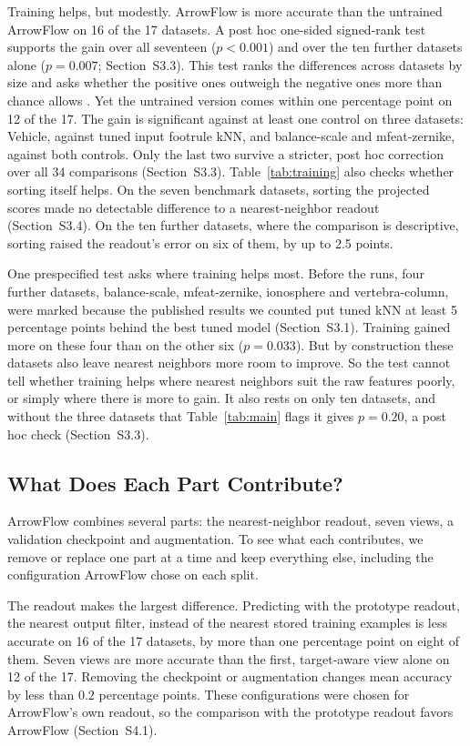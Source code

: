 Training helps, but modestly. ArrowFlow is more accurate than the untrained ArrowFlow on 16 of the 17 datasets. A post hoc one-sided signed-rank test supports the gain over all seventeen ($p<0.001$) and over the ten further datasets alone ($p=0.007$; Section~S3.3). This test ranks the differences across datasets by size and asks whether the positive ones outweigh the negative ones more than chance allows \citep{demsar2006statistical}. Yet the untrained version comes within one percentage point on 12 of the 17. The gain is significant against at least one control on three datasets: Vehicle, against tuned input footrule kNN, and balance-scale and mfeat-zernike, against both controls. Only the last two survive a stricter, post hoc correction over all 34 comparisons (Section~S3.3). Table~\ref{tab:training} also checks whether sorting itself helps. On the seven benchmark datasets, sorting the projected scores made no detectable difference to a nearest-neighbor readout (Section~S3.4). On the ten further datasets, where the comparison is descriptive, sorting raised the readout's error on six of them, by up to 2.5 points.

One prespecified test asks where training helps most. Before the runs, four further datasets, balance-scale, mfeat-zernike, ionosphere and vertebra-column, were marked because the published results we counted \citep{vanschoren2014openml,fernandezdelgado2014hundreds} put tuned kNN at least 5 percentage points behind the best tuned model (Section~S3.1). Training gained more on these four than on the other six ($p=0.033$). But by construction these datasets also leave nearest neighbors more room to improve. So the test cannot tell whether training helps where nearest neighbors suit the raw features poorly, or simply where there is more to gain. It also rests on only ten datasets, and without the three datasets that Table~\ref{tab:main} flags it gives $p=0.20$, a post hoc check (Section~S3.3).

\subsection{What Does Each Part Contribute?}\label{sec:components}

ArrowFlow combines several parts: the nearest-neighbor readout, seven views, a validation checkpoint and augmentation. To see what each contributes, we remove or replace one part at a time and keep everything else, including the configuration ArrowFlow chose on each split.

The readout makes the largest difference. Predicting with the prototype readout, the nearest output filter, instead of the nearest stored training examples is less accurate on 16 of the 17 datasets, by more than one percentage point on eight of them. Seven views are more accurate than the first, target-aware view alone on 12 of the 17. Removing the checkpoint or augmentation changes mean accuracy by less than $0.2$ percentage points. These configurations were chosen for ArrowFlow's own readout, so the comparison with the prototype readout favors ArrowFlow (Section~S4.1).

